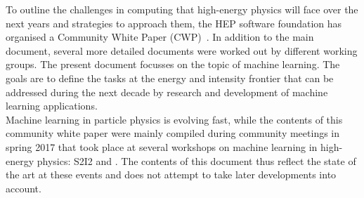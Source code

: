 To outline the challenges in computing that high-energy physics will face over the next years and strategies to approach them, the HEP software foundation has organised a Community White Paper (CWP)~\cite{mainCWP}. In addition to the main document, several more detailed documents were worked out by different working groups. The present document focusses on the topic of machine learning.
The goals are to define the tasks at the energy and intensity frontier that can be addressed during the next decade by research and development of machine learning applications.\\ %

Machine learning in particle physics is evolving fast, while the contents of this community white paper were mainly compiled during community meetings in spring 2017 that took place at several workshops on machine learning in high-energy physics: S2I2 and \cite{DSatHEP2017,IML2017,ACAT2017,HSF2017}.
The contents of this document thus reflect the state of the art at these events and does not attempt to take later developments into account.
